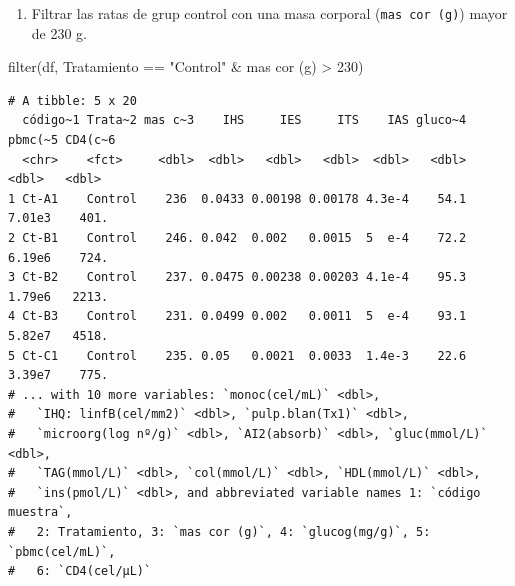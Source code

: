 \documentclass[
  a4paper,
]{scrreport}
\newenvironment{Shaded}{\begin{snugshade}}{\end{snugshade}}
\newcommand{\AttributeTok}[1]{\textcolor[rgb]{0.40,0.45,0.13}{#1}}
\newcommand{\DecValTok}[1]{\textcolor[rgb]{0.68,0.00,0.00}{#1}}
\newcommand{\FunctionTok}[1]{\textcolor[rgb]{0.28,0.35,0.67}{#1}}
\newcommand{\NormalTok}[1]{\textcolor[rgb]{0.00,0.23,0.31}{#1}}
\newcommand{\SpecialCharTok}[1]{\textcolor[rgb]{0.37,0.37,0.37}{#1}}
\newcommand{\StringTok}[1]{\textcolor[rgb]{0.13,0.47,0.30}{#1}}
\providecommand{\tightlist}{%
  \setlength{\itemsep}{0pt}\setlength{\parskip}{0pt}}\usepackage{longtable,booktabs,array}
\theoremstyle{definition}
\theoremstyle{definition}
\theoremstyle{remark}
\begin{document}
\begin{enumerate}
\def\labelenumi{\alph{enumi}.}
\setcounter{enumi}{3}
\tightlist
\item
  Filtrar las ratas de grup control con una masa corporal
  (\texttt{mas\ cor\ (g)}) mayor de 230 g.
\end{enumerate}

\begin{tcolorbox}[enhanced jigsaw, opacitybacktitle=0.6, leftrule=.75mm, title=\textcolor{quarto-callout-note-color}{\faInfo}\hspace{0.5em}{Solución}, coltitle=black, rightrule=.15mm, colframe=quarto-callout-note-color-frame, left=2mm, opacityback=0, colbacktitle=quarto-callout-note-color!10!white, arc=.35mm, bottomtitle=1mm, toptitle=1mm, titlerule=0mm, breakable, bottomrule=.15mm, toprule=.15mm, colback=white]

\begin{Shaded}
\begin{Highlighting}[]
\FunctionTok{filter}\NormalTok{(df, Tratamiento }\SpecialCharTok{==} \StringTok{"Control"} \SpecialCharTok{\&} \StringTok{\textasciigrave{}}\AttributeTok{mas cor (g)}\StringTok{\textasciigrave{}} \SpecialCharTok{\textgreater{}} \DecValTok{230}\NormalTok{)}
\end{Highlighting}
\end{Shaded}

\begin{verbatim}
# A tibble: 5 x 20
  código~1 Trata~2 mas c~3    IHS     IES     ITS    IAS gluco~4 pbmc(~5 CD4(c~6
  <chr>    <fct>     <dbl>  <dbl>   <dbl>   <dbl>  <dbl>   <dbl>   <dbl>   <dbl>
1 Ct-A1    Control    236  0.0433 0.00198 0.00178 4.3e-4    54.1  7.01e3    401.
2 Ct-B1    Control    246. 0.042  0.002   0.0015  5  e-4    72.2  6.19e6    724.
3 Ct-B2    Control    237. 0.0475 0.00238 0.00203 4.1e-4    95.3  1.79e6   2213.
4 Ct-B3    Control    231. 0.0499 0.002   0.0011  5  e-4    93.1  5.82e7   4518.
5 Ct-C1    Control    235. 0.05   0.0021  0.0033  1.4e-3    22.6  3.39e7    775.
# ... with 10 more variables: `monoc(cel/mL)` <dbl>,
#   `IHQ: linfB(cel/mm2)` <dbl>, `pulp.blan(Tx1)` <dbl>,
#   `microorg(log nº/g)` <dbl>, `AI2(absorb)` <dbl>, `gluc(mmol/L)` <dbl>,
#   `TAG(mmol/L)` <dbl>, `col(mmol/L)` <dbl>, `HDL(mmol/L)` <dbl>,
#   `ins(pmol/L)` <dbl>, and abbreviated variable names 1: `código muestra`,
#   2: Tratamiento, 3: `mas cor (g)`, 4: `glucog(mg/g)`, 5: `pbmc(cel/mL)`,
#   6: `CD4(cel/µL)`
\end{verbatim}

\end{tcolorbox}
\end{document}
